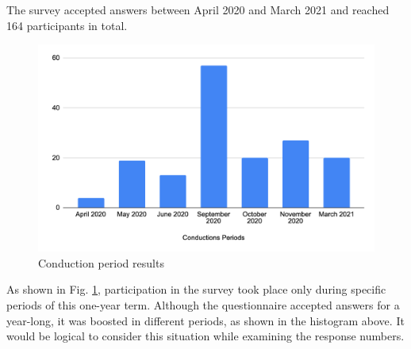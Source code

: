 The survey accepted answers between April 2020 and March 2021 and reached 164 participants in total.
\begin{figure}[ht!]
    \centering
    \includegraphics[scale=0.3]{figures/survey_conduction_period.png}
    \caption{Conduction period results}
    \label{fig:conduction_period}
\end{figure}

As shown in Fig. \ref{fig:conduction_period}, participation in the survey took place only during specific periods of this one-year term. Although the questionnaire accepted answers for a year-long, it was boosted in different periods,  as shown in the histogram above. It would be logical to consider this situation while examining the response numbers.